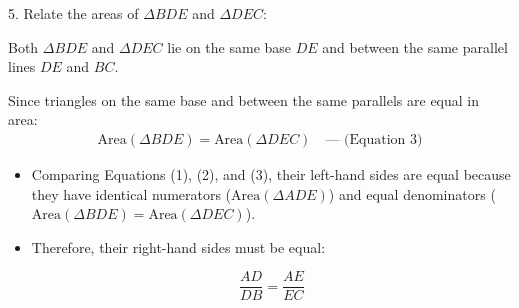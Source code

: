 \begin{enumerate}[label=\thesubsection.\arabic*, ref=\thesubsection.\theenumi]
	
	5. Relate the areas of $\Delta BDE$ and $\Delta DEC$:
	
		 Both $\Delta BDE$ and $\Delta DEC$ lie on the same base $DE$ and between the same parallel lines $DE$ and $BC$.
		
		Since triangles on the same base and between the same parallels are equal in area:
		\begin{align}
		\text{Area}(\Delta BDE) = \text{Area}(\Delta DEC) \quad \text{--- (Equation 3)}
		\end{align}
	
	
	\begin{itemize}
		\item Comparing Equations (1), (2), and (3), their left-hand sides are equal because they have identical numerators ($\text{Area}(\Delta ADE)$) and equal denominators ($\text{Area}(\Delta BDE) = \text{Area}(\Delta DEC)$).
		\item Therefore, their right-hand sides must be equal:
		
		$$\frac{AD}{DB} = \frac{AE}{EC}$$
		
	\end{itemize}
	
	
	
	
	
	
	\noindent
	
\end{enumerate}


